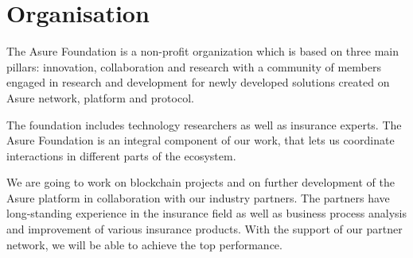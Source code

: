\section{Organisation}

The Asure Foundation is a non-profit organization which is based on three main pillars: innovation, collaboration and research with a community of members engaged in research and development for newly developed solutions created on Asure network, platform and protocol. 

The foundation includes technology researchers as well as insurance experts. The Asure Foundation is an integral component of our work, that lets us coordinate interactions in different parts of the ecosystem. 

We are going to work on blockchain projects and on further development of the Asure platform in collaboration with our industry partners. The partners have long-standing experience in the insurance field as well as business process analysis and improvement of various insurance products. With the support of our partner network, we will be able to achieve the top performance.